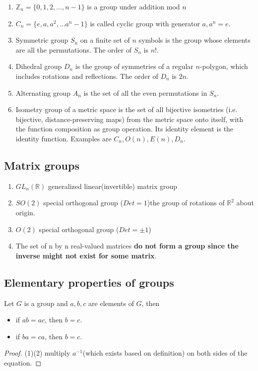 \begin{refsection}
\begin{example}\hfill
\begin{enumerate}
\item $\mathbb{Z}_n = \{0,1,2,...,n-1\}$ is a group under addition mod $n$
\item $C_n = \{e,a,a^2,...a^n-1\}$ is called cyclic group with generator $a, a^n = e$. 
\item Symmetric group $S_n$ on a finite set of $n$ symbols is the group whose elements are all the permutations. The order of $S_n$ is $n!$.
\item Dihedral group $D_n$ is the group of symmetries of a regular $n$-polygon, which includes rotations and reflections. The order of $D_n$ is $2n$.
\item Alternating group $A_n$ is the set of all the even permutations in $S_n$. 
\item Isometry group of a metric space is the set of all bijective isometries (i.e. bijective, distance-preserving maps) from the metric space onto itself, with the function composition as group operation. Its identity element is the identity function. Examples are $C_n, O(n),E(n),D_n$.
\end{enumerate}
\end{example}

\subsection{Matrix groups}
\begin{example}\hfill
	\begin{enumerate}
		\item $GL_n(\mathbb{R})$ generalized linear(invertible) matrix group
		\item $SO(2)$ special orthogonal group ($Det=1$)the group of rotations of $\mathbb{R}^2$ about origin.
		\item $O(2)$ special orthogonal group ($Det=\pm 1$)
		\item The set of n by n real-valued matrices \textbf{do not form a group since the inverse might not exist for some matrix}.
	\end{enumerate}
\end{example}


\subsection{Elementary properties of groups}

\begin{lemma}
Let $G$ is a group and $a,b,c$ are elements of $G$, then
\begin{itemize}
    \item if $ab=ac$, then $b=c$.
    \item if $ba=ca$, then $b=c$.
\end{itemize}
\end{lemma}
\begin{proof}
(1)(2) multiply $a^{-1}$(which exists based on definition) on both sides of the equation.
\end{proof}


\end{refsection}
